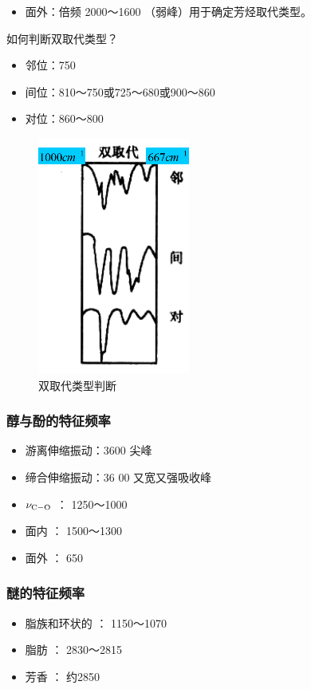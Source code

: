 \begin{itemize}
\begin{itemize}
		\item 面外：倍频 2000～1600 （弱峰）用于确定芳烃取代类型。
	\end{itemize}
	\begin{note}
		如何判断双取代类型？ 
		\begin{itemize}
			\item 邻位：750     
			\item 间位：810～750或725～680或900～860
			\item 对位：860～800
		\end{itemize}
		\begin{figure}[ht]
			\centering
			\includegraphics[width=5cm]{image/chp5_double.png}
			\caption{双取代类型判断}
			\label{fig:double}
		\end{figure}
	\end{note}
\end{itemize}

\subsubsection*{醇与酚的特征频率}
\begin{itemize}          
	\item 游离伸缩振动：3600      尖峰     
	\item 缔合伸缩振动：36 00     又宽又强吸收峰
	\item $\nu_{\ce{C-O}}$          ： 1250～1000   
	\item 面内       ：   1500～1300  
	\item 面外      ： 650 
\end{itemize}

\subsubsection*{醚的特征频率}          
\begin{itemize}         
	\item 脂族和环状的 ： 1150～1070
	\item 脂肪     ：   2830～2815
	\item 芳香    ：  约2850
\end{itemize}
